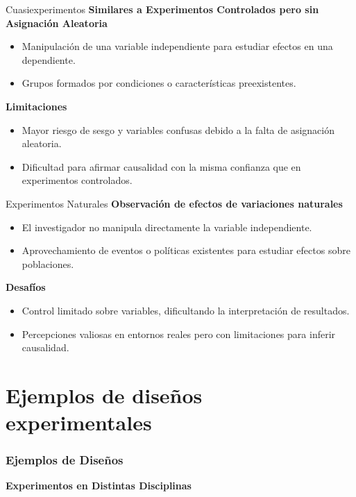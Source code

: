 ﻿\documentclass{beamer}
\begin{document}
\begin{frame}{Cuasiexperimentos}
    \textbf{Similares a Experimentos Controlados pero sin Asignación Aleatoria}
    \begin{itemize}
        \item Manipulación de una variable independiente para estudiar efectos en una dependiente.
        \item Grupos formados por condiciones o características preexistentes.
    \end{itemize}

    \textbf{Limitaciones}
    \begin{itemize}
        \item Mayor riesgo de sesgo y variables confusas debido a la falta de asignación aleatoria.
        \item Dificultad para afirmar causalidad con la misma confianza que en experimentos controlados.
    \end{itemize}
\end{frame}

\begin{frame}{Experimentos Naturales}
    \textbf{Observación de efectos de variaciones naturales}
    \begin{itemize}
        \item El investigador no manipula directamente la variable independiente.
        \item Aprovechamiento de eventos o políticas existentes para estudiar efectos sobre poblaciones.
    \end{itemize}

    \textbf{Desafíos}
    \begin{itemize}
        \item Control limitado sobre variables, dificultando la interpretación de resultados.
        \item Percepciones valiosas en entornos reales pero con limitaciones para inferir causalidad.
    \end{itemize}
\end{frame}


\section{Ejemplos de diseños experimentales}
\begin{frame}
    \frametitle{Ejemplos de Diseños}
    \centering
    \textbf{\Large Experimentos en Distintas Disciplinas}
    \vspace{0.5cm}
\end{frame}
\end{document}
